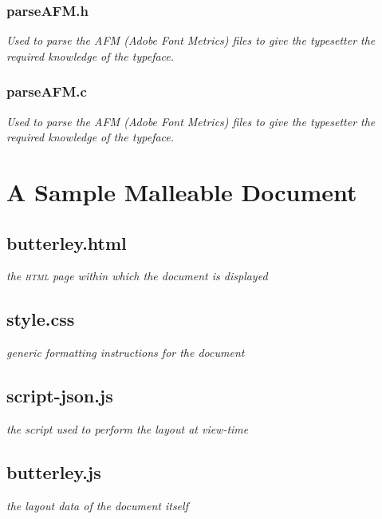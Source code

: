 \newpage

\subsection{parseAFM.h}
\emph{Used to parse the AFM (Adobe Font Metrics) files to give the typesetter the required knowledge of the typeface.}


\newpage

\subsection{parseAFM.c}
\emph{Used to parse the AFM (Adobe Font Metrics) files to give the typesetter the required knowledge of the typeface.}


\newpage

\cleardoublepage
\chapter{A Sample Malleable Document}
\label{app:sampledoc}
\section{butterley.html}
\emph{the \textsc{html} page within which the document is displayed}


\section{style.css}
\emph{generic formatting instructions for the document}

\newpage

\section{script-json.js}
\emph{the script used to perform the layout at view-time}


\newpage

\section{butterley.js}
\emph{the layout data of the document itself}

